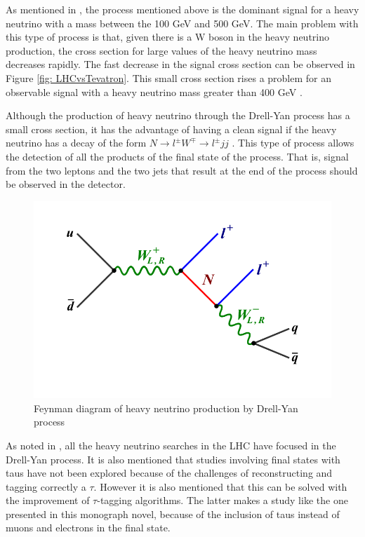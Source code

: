 As mentioned in \cite{HNDrell-Yan}, the process mentioned above is the dominant signal for a heavy neutrino with a mass between the 100 GeV and 500 GeV. The main problem with this type of process is that, given there is a W boson in the heavy neutrino production, the cross section for large values of the heavy neutrino mass decreases rapidly. The fast decrease in the signal cross section can be observed in Figure \ref{fig: LHCvsTevatron}. This small cross section rises a problem for an observable signal with a heavy neutrino mass greater than 400 GeV \cite{HNDrell-Yan}.

Although the production of heavy neutrino through the Drell-Yan process has a small cross section, it has the advantage of having a clean signal if the heavy neutrino has a decay of the form $N \rightarrow l^{\pm} W^{\mp} \rightarrow l^{\pm} jj$ \cite{HNDrell-Yan}. This type of process allows the detection of all the products of the final state of the process. That is, signal from the two leptons and the two jets that result at the end of the process should be observed in the detector. 

\begin{figure}[H]
\centering
\includegraphics[width=\linewidth]{Feynman_HN_DY}
\caption{Feynman diagram of heavy neutrino production by Drell-Yan process}
\label{fig: HN_DY}
\end{figure}

As noted in \cite{See-saw}, all the heavy neutrino searches in the LHC have focused in the Drell-Yan process. It is also mentioned that studies involving final states with taus have not been explored because of the challenges of reconstructing and tagging correctly a $\tau$. However it is also mentioned that this can be solved with the improvement of $\tau$-tagging algorithms. The latter makes a study like the one presented in this monograph novel, because of the inclusion of taus instead of muons and electrons in the final state.   

